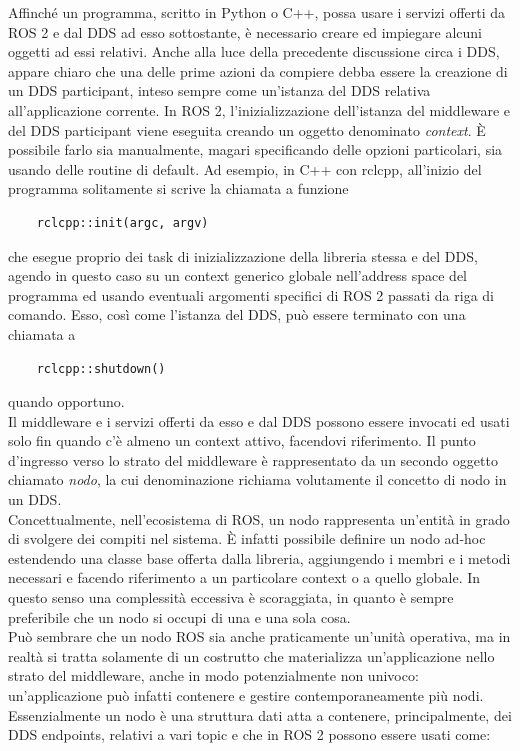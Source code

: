 \indent Affinché un programma, scritto in Python o C++, possa usare i servizi offerti da ROS 2 e dal DDS ad esso sottostante, è necessario creare ed impiegare alcuni oggetti ad essi relativi. Anche alla luce della precedente discussione circa i DDS, appare chiaro che una delle prime azioni da compiere debba essere la creazione di un DDS participant, inteso sempre come un'istanza del DDS relativa all'applicazione corrente. In ROS 2, l'inizializzazione dell'istanza del middleware e del DDS participant viene eseguita creando un oggetto denominato \emph{context}. È possibile farlo sia manualmente, magari specificando delle opzioni particolari, sia usando delle routine di default. Ad esempio, in C++ con rclcpp, all'inizio del programma solitamente si scrive la chiamata a funzione
\begin{verbatim}
    rclcpp::init(argc, argv)
\end{verbatim}
che esegue proprio dei task di inizializzazione della libreria stessa e del DDS, agendo in questo caso su un context generico globale nell'address space del programma ed usando eventuali argomenti specifici di ROS 2 passati da riga di comando. Esso, così come l'istanza del DDS, può essere terminato con una chiamata a
\begin{verbatim}
    rclcpp::shutdown()
\end{verbatim}
quando opportuno.\\
Il middleware e i servizi offerti da esso e dal DDS possono essere invocati ed usati solo fin quando c'è almeno un context attivo, facendovi riferimento. Il punto d'ingresso verso lo strato del middleware è rappresentato da un secondo oggetto chiamato \emph{nodo}, la cui denominazione richiama volutamente il concetto di nodo in un DDS.\\
Concettualmente, nell'ecosistema di ROS, un nodo rappresenta un'entità in grado di svolgere dei compiti nel sistema. È infatti possibile definire un nodo ad-hoc estendendo una classe base offerta dalla libreria, aggiungendo i membri e i metodi necessari e facendo riferimento a un particolare context o a quello globale. In questo senso una complessità eccessiva è scoraggiata, in quanto è sempre preferibile che un nodo si occupi di una e una sola cosa.\\
Può sembrare che un nodo ROS sia anche praticamente un'unità operativa, ma in realtà si tratta solamente di un costrutto che materializza un'applicazione nello strato del middleware, anche in modo potenzialmente non univoco: un'applicazione può infatti contenere e gestire contemporaneamente più nodi. Essenzialmente un nodo è una struttura dati atta a contenere, principalmente, dei DDS endpoints, relativi a vari topic e che in ROS 2 possono essere usati come:
